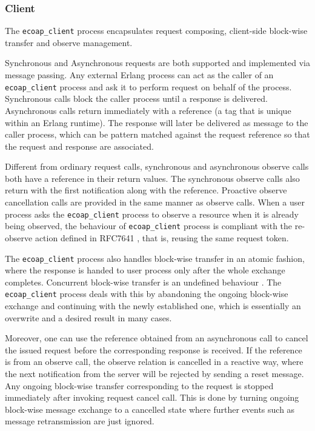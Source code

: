 \subsubsection{Client}

The \verb|ecoap_client| process encapsulates request composing, client-side block-wise transfer and observe management. 

Synchronous and Asynchronous requests are both supported and implemented via message passing. Any external Erlang process can act as the caller of an \verb|ecoap_client| process and ask it to perform request on behalf of the process. Synchronous calls block the caller process until a response is delivered. Asynchronous calls return immediately with a reference (a tag that is unique within an Erlang runtime). The response will later be delivered as message to the caller process, which can be pattern matched against the request reference so that the request and response are associated. 

Different from ordinary request calls, synchronous and asynchronous observe calls both have a reference in their return values. The synchronous observe calls also return with the first notification along with the reference. Proactive observe cancellation calls are provided in the same manner as observe calls. When a user process asks the \verb|ecoap_client| process to observe a resource when it is already being observed, the behaviour of \verb|ecoap_client| process is compliant with the re-observe action defined in RFC7641 \autocite{coap_observe}, that is, reusing the same request token.

The \verb|ecoap_client| process also handles block-wise transfer in an atomic fashion, where the response is handed to user process only after the whole exchange completes. Concurrent block-wise transfer is an undefined behaviour \autocite{blockwise}. The \verb|ecoap_client| process deals with this by abandoning the ongoing block-wise exchange and continuing with the newly established one, which is essentially an overwrite and a desired result in many cases.

Moreover, one can use the reference obtained from an asynchronous call to cancel the issued request before the corresponding response is received. If the reference is from an observe call, the observe relation is cancelled in a reactive way, where the next notification from the server will be rejected by sending a reset message. Any ongoing block-wise transfer corresponding to the request is stopped immediately after invoking request cancel call. This is done by turning ongoing block-wise message exchange to a cancelled state where further events such as message retransmission are just ignored.

